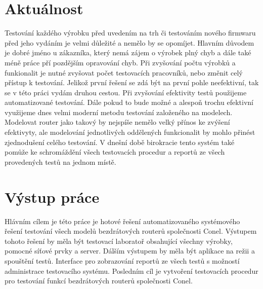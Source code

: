 \section{Aktuálnost}
Testování každého výrobku před uvedením na trh či testováním nového firmwaru před jeho vydáním je velmi důležité a nemělo by se opomíjet. Hlavním důvodem je dobré jméno u zákazníka, který nemá zájem o výrobek plný chyb a dále také méně práce pří pozdějším opravování chyb. Při zvyšování počtu výrobků a funkionalit je nutné zvyšovat počet testovacích pracovníků, nebo změnit celý přístup k testování. Jelikož první řešení se zdá být na první pohle neefektivní, tak se v této práci vydám druhou cestou. Při zvyšování efektivity testů použijeme automatizované testování. Dále pokud to bude možné a alespoň trochu efektivní využijeme dnes velmi moderní metodu testování založeného na modelech. Modelovat router jako takový by nejspíše nemělo velký přínos ke zvýšení efektivyty, ale modelování jednotlivých oddělených funkcionalit by mohlo přinést zjednodušení celého testování. V dnešní době birokracie tento systém také pomůže ke schromáždění všech testovacích procedur a reportů ze všech provedených testů na jednom místě.


\section{Výstup práce}
Hlávním cílem je této práce je hotové řešení automatizovaného systémového řešení testování všech modelů bezdrátových routerů společnosti Conel. Výstupem tohoto řešení by měla být testovací laboratoř obsahující všechny výrobky, pomocné síťové prvky a server. Dálším výstupem by měla být aplikace na režii a spouštění testů. Interface pro zobrazování reportů ze všech testů s možností administrace testovacího systému. Posledním cíl je vytvoření testovacích procedur pro testování funkcí bezdrátových routerů společnosti Conel.

